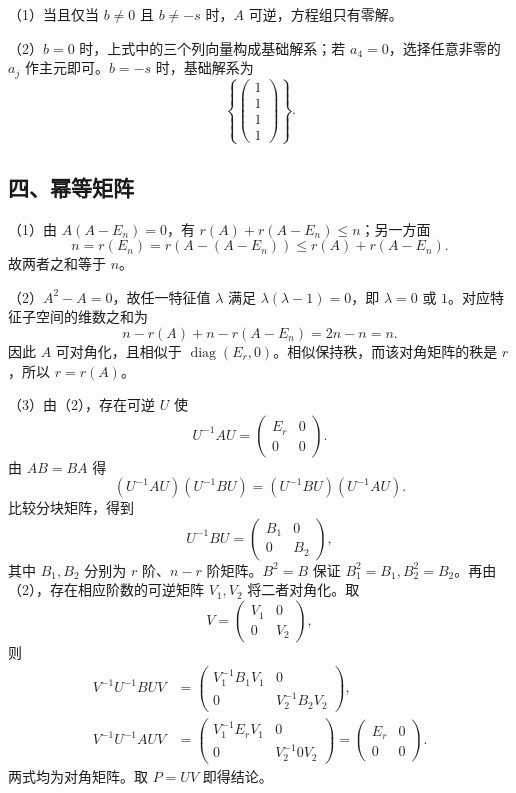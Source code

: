 \documentclass[11pt,fontset=fandol]{ctexart}
\begin{document}
（1）当且仅当 \(b\ne0\) 且 \(b\ne-s\) 时，\(A\) 可逆，方程组只有零解。

（2）\(b=0\) 时，上式中的三个列向量构成基础解系；若
\(a_4=0\)，选择任意非零的 \(a_j\) 作主元即可。\(b=-s\) 时，基础解系为 \[
\left\{\begin{pmatrix}1\\1\\1\\1\end{pmatrix}\right\}.
\]

\subsection{四、幂等矩阵}\label{ux56dbux5e42ux7b49ux77e9ux9635}

（1）由 \(A(A-E_n)=0\)，有 \(r(A)+r(A-E_n)\le n\)；另一方面 \[
n=r(E_n)=r(A-(A-E_n))\le r(A)+r(A-E_n).
\] 故两者之和等于 \(n\)。

（2）\(A^2-A=0\)，故任一特征值 \(\lambda\) 满足
\(\lambda(\lambda-1)=0\)，即 \(\lambda=0\) 或
\(1\)。对应特征子空间的维数之和为 \[
n-r(A)+n-r(A-E_n)=2n-n=n.
\] 因此 \(A\) 可对角化，且相似于
\(\operatorname{diag}(E_r,0)\)。相似保持秩，而该对角矩阵的秩是
\(r\)，所以 \(r=r(A)\)。

（3）由（2），存在可逆 \(U\) 使 \[
U^{-1}AU=\begin{pmatrix}E_r&0\\0&0\end{pmatrix}.
\] 由 \(AB=BA\) 得 \[
(U^{-1}AU)(U^{-1}BU)=(U^{-1}BU)(U^{-1}AU).
\] 比较分块矩阵，得到 \[
U^{-1}BU=\begin{pmatrix}B_1&0\\0&B_2\end{pmatrix},
\] 其中 \(B_1,B_2\) 分别为 \(r\) 阶、\(n-r\) 阶矩阵。\(B^2=B\) 保证
\(B_1^2=B_1,B_2^2=B_2\)。再由（2），存在相应阶数的可逆矩阵 \(V_1,V_2\)
将二者对角化。取 \[
V=\begin{pmatrix}V_1&0\\0&V_2\end{pmatrix},
\] 则 \[
\begin{aligned}
V^{-1}U^{-1}BUV&=\begin{pmatrix}V_1^{-1}B_1V_1&0\\0&V_2^{-1}B_2V_2\end{pmatrix},\\
V^{-1}U^{-1}AUV&=\begin{pmatrix}V_1^{-1}E_rV_1&0\\0&V_2^{-1}0V_2\end{pmatrix}
=\begin{pmatrix}E_r&0\\0&0\end{pmatrix}.
\end{aligned}
\] 两式均为对角矩阵。取 \(P=UV\) 即得结论。
\end{document}
